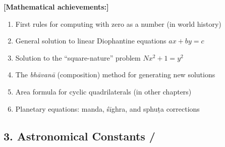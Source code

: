 \documentclass[10pt,a4paper]{article}
\begin{document}
\hfill\vline\hfill%

\begin{minipage}[t]{0.47\textwidth}

\textbf{[Mathematical achievements:]}

\begin{enumerate}

\item First rules for computing with zero as a number (in world history)

\item General solution to linear Diophantine equations $ax + by = c$

\item Solution to the ``square-nature'' problem $Nx^2 + 1 = y^2$

\item The \textit{bhāvanā} (composition) method for generating new solutions

\item Area formula for cyclic quadrilaterals (in other chapters)

\item Planetary equations: manda, śīghra, and sphuṭa corrections

\end{enumerate}

\end{minipage}



\vspace{1.5em}



\subsection*{3. Astronomical Constants / }
\end{document}
